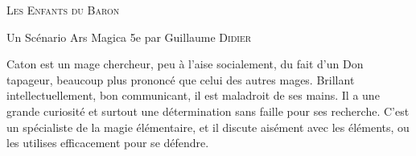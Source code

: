 \begin{center}
\vfill
    {\Large\scshape Les Enfants du Baron\par}
    \vspace{0.5cm}
{Un Scénario Ars Magica 5e par Guillaume \textsc{Didier}\par}
    \vfill
    {\LARGE\bfseries \magusname \par}



\vfill
    \begin{center}
        \parbox{.8\textwidth}{
            Caton est un mage chercheur, peu à l'aise socialement, du fait d'un Don tapageur, beaucoup plus prononcé que celui des autres mages. Brillant intellectuellement, bon communicant, il est maladroit de ses mains. Il a une grande curiosité et surtout une détermination sans faille pour ses recherche. C'est un spécialiste de la magie élémentaire, et il discute aisément avec les éléments, ou les utilises efficacement pour se défendre.}
    \end{center}
\vfill
\end{center}
\pagebreak

\shortsheet{}



